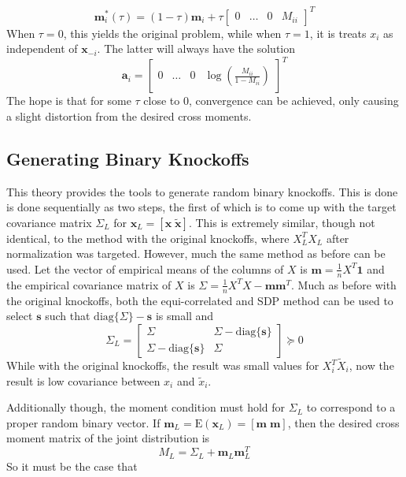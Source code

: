 \documentclass[11pt]{article}
\newcommand{\E}{\mathrm{E}}
\newcommand{\diag}[1]{\mathrm{diag}\{#1\}}
\theoremstyle{definition}
\begin{document}
    \[\mathbf m_i^*(\tau) = (1-\tau)\mathbf m_i + \tau \left[ \begin{array}{cccc} 0 & \ldots & 0 & M_{ii} \end{array} \right]^T \]
            When $\tau=0$, this yields the original problem, while when $\tau=1$, it is treats $x_i$ as independent of $\mathbf x_{-i}$. The latter will always have the solution
            \[\mathbf a_i = \left[ \begin{array}{cccc} 0 & \ldots & 0 & \log\left(\frac{M_{ii}}{1-M_{ii}}\right) \end{array} \right]^T \]
            The hope is that for some $\tau$ close to $0$, convergence can be achieved, only causing a slight distortion from the desired cross moments.

\subsection{Generating Binary Knockoffs}
This theory provides the tools to generate random binary knockoffs. This is done is done sequentially as two steps, the first of which is to come up with the target covariance matrix $\Sigma_L$ for $\mathbf x_L = [\mathbf x\; \mathbf{\tilde x}]$. This is extremely similar, though not identical, to the method with the original knockoffs, where $X_L^TX_L$ after normalization was targeted. However, much the same method as before can be used. Let the vector of empirical means of the columns of $X$ is $\mathbf m = \frac{1}{n}X^T\mathbf 1$ and the empirical covariance matrix of $X$ is $\Sigma = \frac{1}{n}X^TX - \mathbf{m}\mathbf{m}^T$. Much as before with the original knockoffs, both the equi-correlated and SDP method can be used to select  $\mathbf s$  such that $\diag{\Sigma}-\mathbf s$ is small and 
        \[ \Sigma_L = \left[\begin{array}{cc}  \Sigma & \Sigma - \diag{\mathbf s }\\ \Sigma - \diag{\mathbf s} & \Sigma \end{array}\right] \succeq 0 \]
    While with the original knockoffs, the result was small values for $X_i^T\tilde X_i$, now the result is low covariance between $x_i$ and $\tilde x_i$.\par
    Additionally though, the moment condition must hold for $\Sigma_L$ to correspond to a proper random binary vector. If $\mathbf m_L = \E\left(\mathbf x_L\right) = [\mathbf m \; \mathbf m]$, then the desired cross moment matrix of the joint distribution is 
        \[ M_L = \Sigma_L + \mathbf m_L\mathbf m_L^T\]
        So it must be the case that  
\end{document}
